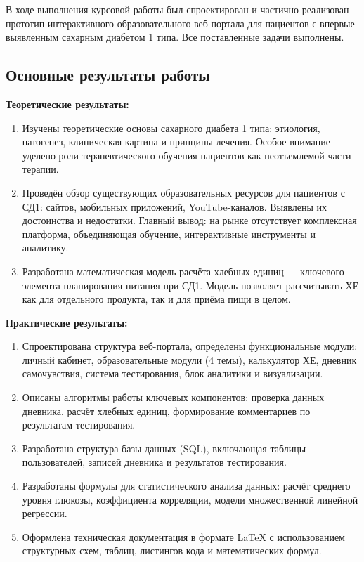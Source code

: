 \documentclass[14pt, a4paper]{extarticle}
\begin{document}
\noindent В ходе выполнения курсовой работы был спроектирован и частично реализован прототип интерактивного образовательного веб-портала для пациентов с впервые выявленным сахарным диабетом 1 типа. Все поставленные задачи выполнены.

\subsection*{Основные результаты работы}

\noindent \textbf{Теоретические результаты:}

\begin{enumerate}
\item Изучены теоретические основы сахарного диабета 1 типа: этиология, патогенез, клиническая картина и принципы лечения. Особое внимание уделено роли терапевтического обучения пациентов как неотъемлемой части терапии.

\item Проведён обзор существующих образовательных ресурсов для пациентов с СД1: сайтов, мобильных приложений, YouTube-каналов. Выявлены их достоинства и недостатки. Главный вывод: на рынке отсутствует комплексная платформа, объединяющая обучение, интерактивные инструменты и аналитику.

\item Разработана математическая модель расчёта хлебных единиц — ключевого элемента планирования питания при СД1. Модель позволяет рассчитывать ХЕ как для отдельного продукта, так и для приёма пищи в целом.
\end{enumerate}

\noindent \textbf{Практические результаты:}

\begin{enumerate}
\item Спроектирована структура веб-портала, определены функциональные модули: личный кабинет, образовательные модули (4 темы), калькулятор ХЕ, дневник самочувствия, система тестирования, блок аналитики и визуализации.

\item Описаны алгоритмы работы ключевых компонентов: проверка данных дневника, расчёт хлебных единиц, формирование комментариев по результатам тестирования.

\item Разработана структура базы данных (SQL), включающая таблицы пользователей, записей дневника и результатов тестирования.

\item Разработаны формулы для статистического анализа данных: расчёт среднего уровня глюкозы, коэффициента корреляции, модели множественной линейной регрессии.

\item Оформлена техническая документация в формате \LaTeX{} с использованием структурных схем, таблиц, листингов кода и математических формул.
\end{enumerate}
\end{document}
